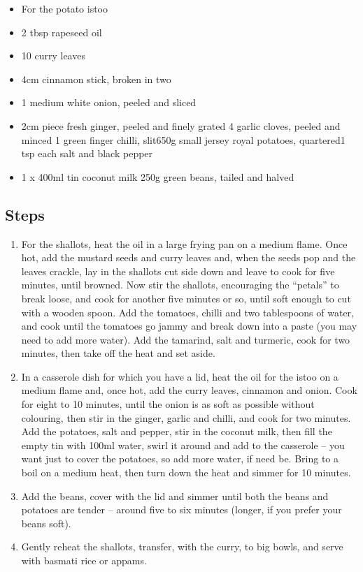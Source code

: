 \documentclass{book}
\begin{document}
\begin{itemize}
\item For the potato istoo
\item 2 tbsp rapeseed oil 
\item 10 curry leaves 
\item 4cm cinnamon stick, broken in two
\item 1 medium white onion, peeled and sliced 
\item 2cm piece fresh ginger, peeled and finely grated 4 garlic cloves, peeled and minced 1 green finger chilli, slit650g small jersey royal potatoes, quartered1 tsp each salt and black pepper 
\item 1 x 400ml tin coconut milk 250g green beans, tailed and halved
\end{itemize}

\subsection*{Steps}
\begin{enumerate}
\item For the shallots, heat the oil in a large frying pan on a medium flame. Once hot, add the mustard seeds and curry leaves and, when the seeds pop and the leaves crackle, lay in the shallots cut side down and leave to cook for five minutes, until browned. Now stir the shallots, encouraging the “petals” to break loose, and cook for another five minutes or so, until soft enough to cut with a wooden spoon. Add the tomatoes, chilli and two tablespoons of water, and cook until the tomatoes go jammy and break down into a paste (you may need to add more water). Add the tamarind, salt and turmeric, cook for two minutes, then take off the heat and set aside.
\item In a casserole dish for which you have a lid, heat the oil for the istoo on a medium flame and, once hot, add the curry leaves, cinnamon and onion. Cook for eight to 10 minutes, until the onion is as soft as possible without colouring, then stir in the ginger, garlic and chilli, and cook for two minutes. Add the potatoes, salt and pepper, stir in the coconut milk, then fill the empty tin with 100ml water, swirl it around and add to the casserole – you want just to cover the potatoes, so add more water, if need be. Bring to a boil on a medium heat, then turn down the heat and simmer for 10 minutes.
\item Add the beans, cover with the lid and simmer until both the beans and potatoes are tender – around five to six minutes (longer, if you prefer your beans soft).
\item Gently reheat the shallots, transfer, with the curry, to big bowls, and serve with basmati rice or appams.
\end{enumerate}
\newpage
\end{document}
